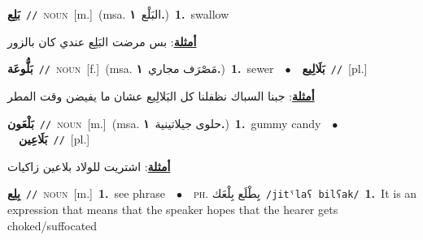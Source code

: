 \documentclass[10pt,a4paper,twoside]{article} %
\begin{document}
\begin{multicols}{2}
{\setlength\topsep{0pt}\textbf{\foreignlanguage{arabic}{بَلِع}}\ {\color{gray}\texttt{//}\color{black}}\ \textsc{noun}\ [m.]\ \color{gray}(msa. \foreignlanguage{arabic}{البَلْع}~\foreignlanguage{arabic}{\textbf{١.}})\color{black}\ \textbf{1.}~swallow\  \begin{flushright}\color{gray}\foreignlanguage{arabic}{\textbf{\underline{\foreignlanguage{arabic}{أمثلة}}}: بس مرضت البَلِع عندي كان بالزور}\end{flushright}\color{black}} \vspace{2mm}

{\setlength\topsep{0pt}\textbf{\foreignlanguage{arabic}{بَلُّوعَة}}\ {\color{gray}\texttt{//}\color{black}}\ \textsc{noun}\ [f.]\ \color{gray}(msa. \foreignlanguage{arabic}{مَصْرَف مجاري}~\foreignlanguage{arabic}{\textbf{١.}})\color{black}\ \textbf{1.}~sewer\ \ $\bullet$\ \ \setlength\topsep{0pt}\textbf{\foreignlanguage{arabic}{بَلَالِيع}}\ {\color{gray}\texttt{//}\color{black}}\ [pl.]\  \begin{flushright}\color{gray}\foreignlanguage{arabic}{\textbf{\underline{\foreignlanguage{arabic}{أمثلة}}}: جبنا السباك نظفلنا كل البَلالِيع عشان ما يفيضن وقت المطر}\end{flushright}\color{black}} \vspace{2mm}

{\setlength\topsep{0pt}\textbf{\foreignlanguage{arabic}{بَلْعَون}}\ {\color{gray}\texttt{//}\color{black}}\ \textsc{noun}\ [m.]\ \color{gray}(msa. \foreignlanguage{arabic}{حلوى جيلاتينية}~\foreignlanguage{arabic}{\textbf{١.}})\color{black}\ \textbf{1.}~gummy candy\ \ $\bullet$\ \ \setlength\topsep{0pt}\textbf{\foreignlanguage{arabic}{بَلَاعِين}}\ {\color{gray}\texttt{//}\color{black}}\ [pl.]\  \begin{flushright}\color{gray}\foreignlanguage{arabic}{\textbf{\underline{\foreignlanguage{arabic}{أمثلة}}}: اشتريت للولاد بلاعين زاكيات}\end{flushright}\color{black}} \vspace{2mm}

{\setlength\topsep{0pt}\textbf{\foreignlanguage{arabic}{بِلِع}}\ {\color{gray}\texttt{//}\color{black}}\ \textsc{noun}\ [m.]\ \textbf{1.}~see phrase\ \ $\bullet$\ \ \textsc{ph.} \color{gray} \foreignlanguage{arabic}{يِطْلَع بِلْعَك}\color{black}\ {\color{gray}\texttt{/{\sffamily jitˤlaʕ bilʕak}/}\color{black}}\ \textbf{1.}~It is an expression that means that the speaker hopes that the hearer gets choked/suffocated\ } \vspace{2mm}


\end{multicols}
\end{document}
